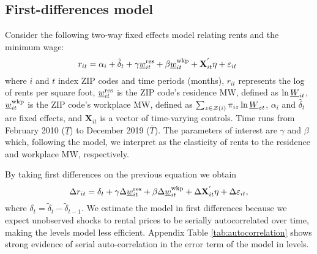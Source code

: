     
\subsection{First-differences model}

Consider the following two-way fixed effects model relating rents and the 
minimum wage:
\begin{equation*} \label{eq:did_lev}
    r_{it} = \alpha_i + \tilde{\delta}_t 
           + \gamma \underline{w}^{\text{res}}_{it} + \beta \underline{w}^{\text{wkp}}_{it}
           + \mathbf{X}^{'}_{it}\eta
           + \varepsilon_{it} \ 
\end{equation*}    
where
$i$ and $t$ index ZIP codes and time periods (months),
$r_{it}$ represents the log of rents per square foot,
$\underline{w}^{\text{res}}_{it}$ is the ZIP code's residence MW, defined as 
$\ln \underline{W}_{it}$,
$\underline{w}^{\text{wkp}}_{it}$ is the ZIP code's workplace MW, defined as 
$\sum_{z\in\mathcal{Z}(i)} \pi_{iz}\ln \underline{W}_{zt}$,
$\alpha_i$ and $\hat{\delta}_t$ are fixed effects, and 
$\mathbf{X}_{it}$ is a vector of time-varying controls.
Time runs from February 2010 ($\underline{T}$) to December 2019 ($\overline{T}$).
The parameters of interest are $\gamma$ and $\beta$ which, following the model, 
we interpret as the elasticity of rents to the residence and workplace MW, 
respectively.

By taking first differences on the previous equation we obtain
\begin{equation}\label{eq:fd}
    \Delta r_{it} = \delta_t
                  + \gamma \Delta \underline{w}^{\text{res}}_{it} + \beta \Delta \underline{w}^{\text{wkp}}_{it}
                  + \Delta \mathbf{X}^{'}_{it}\eta
                  + \Delta \varepsilon_{it} ,
\end{equation}
where $\delta_t = \tilde{\delta}_t - \tilde{\delta}_{t-1}$.
We estimate the model in first differences because we expect unobserved shocks
to rental prices to be serially autocorrelated over time, making the levels
model less efficient.
Appendix Table \ref{tab:autocorrelation} shows strong evidence of serial 
auto-correlation in the error term of the model in levels.

